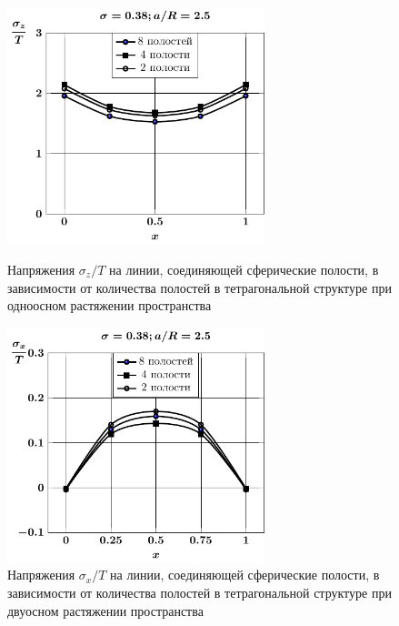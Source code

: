 \begin{figure}[h!]
\centering\footnotesize
\parbox[b]{7.5cm}{\centering\includegraphics[width=7.5cm]{cav8-4-2-sig_z-spheres.pdf}
\caption{Напряжения $\sigma_z/T$ на линии, соединяющей сферические полости, в зависимости от количества полостей в тетрагональной структуре при одноосном растяжении пространства
\label{f:8:8}}}\hfil\hfil
\parbox[b]{7.5cm}{\centering\includegraphics[width=7.5cm]{cav8-4-2-sig_x-spheres-tension2.pdf}
\caption{Напряжения $\sigma_x/T$ на линии, соединяющей сферические полости, в зависимости от количества полостей в тетрагональной структуре при двуосном растяжении пространства
\label{f:8:12}}}
\end{figure}


%

